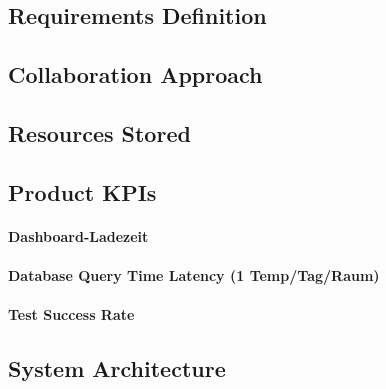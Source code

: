 \documentclass{article}
\begin{document}
\subsection{Requirements Definition}

\subsection{Collaboration Approach}

\subsection{Resources Stored}







\subsection{Product KPIs}

\paragraph{Dashboard-Ladezeit}
\paragraph{Database Query Time Latency (1 Temp/Tag/Raum)}
\paragraph{Test Success Rate}





\subsection{System Architecture}
\end{document}
